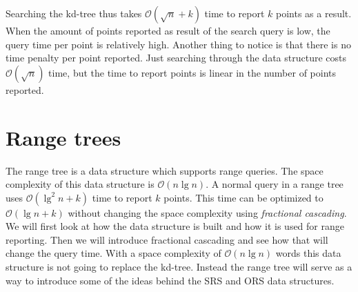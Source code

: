 
Searching the kd-tree thus takes $\mathcal{O}(\sqrt{n} + k)$ time to report $k$ points as a result. When the amount of points reported as result of the search query is low, the query time per point is relatively high. Another thing to notice is that there is no time penalty per point reported. Just searching through the data structure costs $\mathcal{O}(\sqrt{n})$ time, but the time to report points is linear in the number of points reported.



\section{Range trees}
\label{sect:rangetrees}

The range tree is a data structure which supports range queries. The space complexity of this data structure is $\mathcal{O}(n\lg n)$. A normal query in a range tree uses $\mathcal{O}(\lg^2 n + k)$ time to report $k$ points. This time can be optimized to $\mathcal{O}(\lg n + k)$ without changing the space complexity using \emph{fractional cascading}. We will first look at how the data structure is built and how it is used for range reporting. Then we will introduce fractional cascading and see how that will change the query time. With a space complexity of $\mathcal{O}(n \lg n)$ words this data structure is not going to replace the kd-tree. Instead the range tree will serve as a way to introduce some of the ideas behind the SRS and ORS data structures. \\


